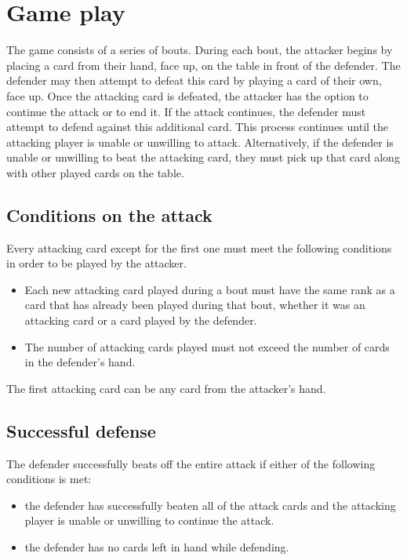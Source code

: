 \section{Game play}
The game consists of a series of bouts. During each bout, the attacker begins by placing a card from their hand, face up, on the table in front of the defender. The defender may then attempt to defeat this card by playing a card of their own, face up. Once the attacking card is defeated, the attacker has the option to continue the attack or to end it. If the attack continues, the defender must attempt to defend against this additional card. This process continues until the attacking player is unable or unwilling to attack. Alternatively, if the defender is unable or unwilling to beat the attacking card, they must pick up that card along with other played cards on the table.

\subsection{Conditions on the attack}
\label{attackconditions}
Every attacking card except for the first one must meet the following conditions in order to be played by the attacker.

\begin{itemize}
    \item Each new attacking card played during a bout must have the same rank as a card that has already been played during that bout, whether it was an attacking card or a card played by the defender.
    \item The number of attacking cards played must not exceed the number of cards in the defender's hand.
\end{itemize}
The first attacking card can be any card from the attacker's hand.

\subsection{Successful defense}
The defender successfully beats off the entire attack if either of the following conditions is met:
\begin{itemize}
    \item the defender has successfully beaten all of the attack cards and the attacking player is unable or unwilling to continue the attack.
    \item the defender has no cards left in hand while defending.
\end{itemize}

